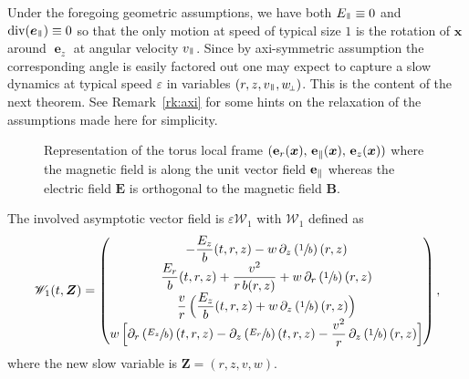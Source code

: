 \documentclass[JEP,XML,SOM,Unicode]{cedram}
\let\mathcal\mathscr
\newcommand{\sperp}{{\scriptscriptstyle\perp}}
\let\eps\varepsilon
\let\d\partial
\DeclareMathOperator{\Div}{div}
\theoremstyle{plain}
\theoremstyle{definition}
\newcommand\bp{\begin{pmatrix}}
\newcommand\ep{\end{pmatrix}}
\newcommand\bB{{\boldsymbol B}}
\newcommand\bE{{\boldsymbol E}}
\newcommand\bfx{{\boldsymbol x}}
\newcommand\bfZ{{\boldsymbol Z}}
\newcommand\cW{{\mathcal W}}
\DeclareMathOperator{\beD}{\boldsymbol{e}}
\newcommand\eDz{\beD_z}
\newcommand\eDpar{\beD_\mypar}
\newcommand\vpar{v_\mypar}
\newcommand\eperp{w_{\!\sperp}}
\let\e w
\newcommand\Epar{E_\mypar}
\newcommand\Er{E_r}
\newcommand\Ez{E_z}
\newcommand{\mypar}{{\mkern3mu\vphantom{\perp}\vrule depth 0pt\mkern2mu\vrule depth 0pt\mkern3mu}}
\begin{document}
Under the foregoing geometric assumptions, we have both $\Epar\equiv0$ and $\Div(\eDpar)\equiv0$ so that the only motion at speed of typical size $1$ is the rotation of $\bfx$ around $\eDz$ at angular velocity $\vpar$. Since by axi-symmetric assumption the corresponding angle is easily factored out one may expect to capture a slow dynamics at typical speed $\eps$ in variables $(r,z,\vpar,\eperp)$. This is the content of the next theorem. See Remark~\ref{rk:axi} for some hints on the relaxation of the assumptions made here for simplicity.
\begin{figure}[htb]
\begin{center}
\vspace*{-\baselineskip}
\end{center}
\label{fig:1}
\caption{\smaller Representation of the torus local frame $({\bf e}_r(\bfx),\, {\bf
e}_\parallel(\bfx), \,{\bf e}_z(\bfx))$ where the magnetic
field is along the unit vector field ${\bf
e}_\parallel$ whereas the electric field $\bE$ is
orthogonal to the magnetic field $\bB$.}
\end{figure}

The involved asymptotic vector field is $\eps\cW_1$ with $\cW_1$ defined as
\[
\cW_1(t,\bfZ)
=\bp
-\dfrac{\Ez}{b}(t,r,z)-\e\,\d_z\left(\sfrac1b\right)(r,z)\\
\dfrac{\Er}{b}(t,r,z)+\dfrac{v^2}{r\,b(r,z)}
+\e\,\d_r\left(\sfrac1b\right)(r,z)
\\
\dfrac{v}{r}\,\Bigl(\dfrac{\Ez}{b}(t,r,z)
+\e\,\d_z\left(\sfrac1b\right)(r,z)\Bigr)\\
\e\,\Bigl[\d_r\left(\sfrac{\Ez}{b}\right)(t,r,z)-\d_z\left(\sfrac{\Er}{b}\right)(t,r,z)
-\dfrac{v^2}{r}\,\d_z\left(\sfrac1b\right)(r,z)\Bigr]
\ep,
\]
where the new slow variable is $\bfZ=(r,z,v,\e)$.
\end{document}
